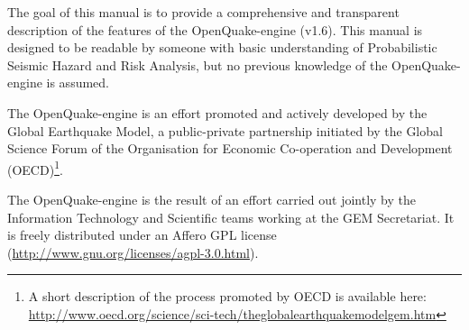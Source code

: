 The goal of this manual is to provide a comprehensive and transparent description of the features of the OpenQuake-engine (v1.6). This manual is designed to be readable by someone with basic understanding of Probabilistic Seismic Hazard and Risk Analysis, but no previous knowledge of the OpenQuake-engine is assumed.

The OpenQuake-engine is an effort promoted and actively developed by the Global Earthquake Model, a public-private partnership initiated by the Global Science Forum of the Organisation for Economic Co-operation and Development (OECD)\footnote{A short description of the process promoted by OECD is available here:\\\href{http://www.oecd.org/science/sci-tech/theglobalearthquakemodelgem.htm}{http://www.oecd.org/science/sci-tech/theglobalearthquakemodelgem.htm}}.

The OpenQuake-engine is the result of an effort carried out jointly by the Information Technology and Scientific teams working at the GEM Secretariat. It is freely distributed under an Affero GPL license (\href{http://www.gnu.org/licenses/agpl-3.0.html}{http://www.gnu.org/licenses/agpl-3.0.html}).
